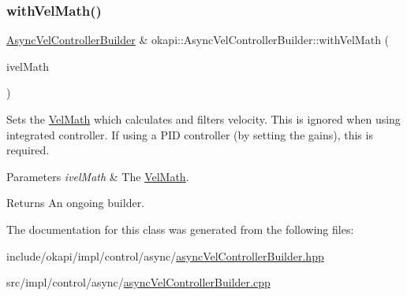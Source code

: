 \subsubsection{\texorpdfstring{withVelMath()}{withVelMath()}}
{\footnotesize\ttfamily \mbox{\hyperlink{classokapi_1_1AsyncVelControllerBuilder}{Async\+Vel\+Controller\+Builder}} \& okapi\+::\+Async\+Vel\+Controller\+Builder\+::with\+Vel\+Math (\begin{DoxyParamCaption}\item[{std\+::unique\+\_\+ptr$<$ \mbox{\hyperlink{classokapi_1_1VelMath}{Vel\+Math}} $>$}]{ivel\+Math }\end{DoxyParamCaption})}

Sets the \mbox{\hyperlink{classokapi_1_1VelMath}{Vel\+Math}} which calculates and filters velocity. This is ignored when using integrated controller. If using a P\+ID controller (by setting the gains), this is required.


\begin{DoxyParams}{Parameters}
{\em ivel\+Math} & The \mbox{\hyperlink{classokapi_1_1VelMath}{Vel\+Math}}. \\
\hline
\end{DoxyParams}
\begin{DoxyReturn}{Returns}
An ongoing builder. 
\end{DoxyReturn}


The documentation for this class was generated from the following files\+:\begin{DoxyCompactItemize}
\item 
include/okapi/impl/control/async/\mbox{\hyperlink{asyncVelControllerBuilder_8hpp}{async\+Vel\+Controller\+Builder.\+hpp}}\item 
src/impl/control/async/\mbox{\hyperlink{asyncVelControllerBuilder_8cpp}{async\+Vel\+Controller\+Builder.\+cpp}}\end{DoxyCompactItemize}
